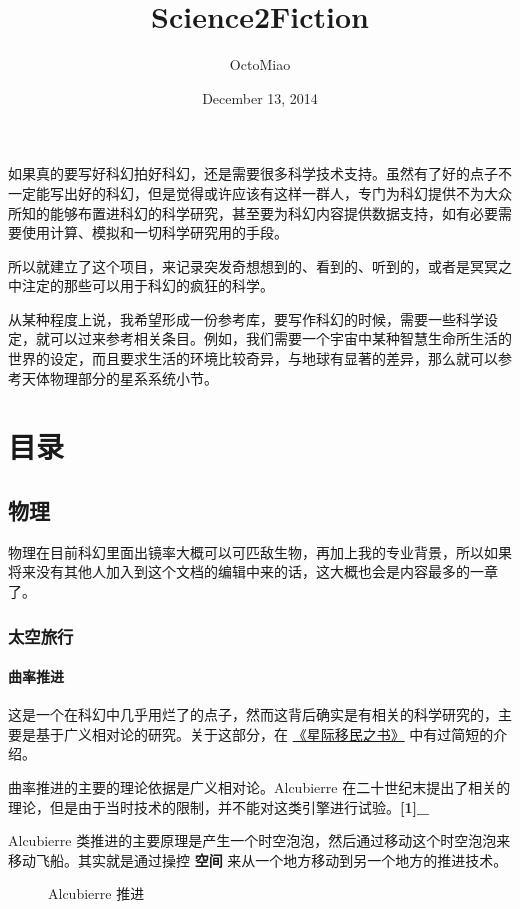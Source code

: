 \documentclass[letterpaper,10pt,english]{sphinxmanual}
\title{Science2Fiction}
\date{December 13, 2014}
\author{OctoMiao}
\begin{document}
\maketitle
\tableofcontents
{}\label{index::doc}


如果真的要写好科幻拍好科幻，还是需要很多科学技术支持。虽然有了好的点子不一定能写出好的科幻，但是觉得或许应该有这样一群人，专门为科幻提供不为大众所知的能够布置进科幻的科学研究，甚至要为科幻内容提供数据支持，如有必要需要使用计算、模拟和一切科学研究用的手段。

所以就建立了这个项目，来记录突发奇想想到的、看到的、听到的，或者是冥冥之中注定的那些可以用于科幻的疯狂的科学。

从某种程度上说，我希望形成一份参考库，要写作科幻的时候，需要一些科学设定，就可以过来参考相关条目。例如，我们需要一个宇宙中某种智慧生命所生活的世界的设定，而且要求生活的环境比较奇异，与地球有显著的差异，那么就可以参考天体物理部分的星系系统小节。


\chapter{目录}
\label{index:id2}\label{index:id1}

\section{物理}
\label{physics::doc}\label{physics:id1}
物理在目前科幻里面出镜率大概可以可匹敌生物，再加上我的专业背景，所以如果将来没有其他人加入到这个文档的编辑中来的话，这大概也会是内容最多的一章了。


\subsection{太空旅行}
\label{physics:id2}

\subsubsection{曲率推进}
\label{physics:id3}
这是一个在科幻中几乎用烂了的点子，然而这背后确实是有相关的科学研究的，主要是基于广义相对论的研究。关于这部分，在 \href{http://interimm.org/InterImmBook/tech/propulsion.html}{《星际移民之书》} 中有过简短的介绍。

曲率推进的主要的理论依据是广义相对论。Alcubierre 在二十世纪末提出了相关的理论，但是由于当时技术的限制，并不能对这类引擎进行试验。{\color{red}\bfseries{}{[}1{]}\_}

Alcubierre 类推进的主要原理是产生一个时空泡泡，然后通过移动这个时空泡泡来移动飞船。其实就是通过操控 \textbf{空间} 来从一个地方移动到另一个地方的推进技术。
\begin{figure}[htbp]
\centering
\capstart
\caption{Alcubierre 推进}\end{figure}
\end{document}

